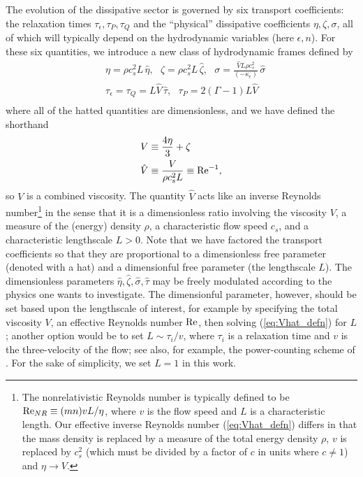 \documentclass[%
notitlepage,
superscriptaddress,
nofootinbib,
amsmath,
amssymb,
aps,
twocolumn
]{revtex4-1}
\newcommand{\Ren}{\textnormal{Re}}
\begin{document}
The evolution of the dissipative sector is governed by six transport
coefficients: the
relaxation times $\tau_{\epsilon}, \tau_{P}, \tau_{Q}$ and the ``physical''
dissipative coefficients $\eta, \zeta, \sigma$,
all of which will typically depend on the hydrodynamic variables
(here $\epsilon, n$).
For these six quantities,
we introduce a new class of hydrodynamic frames defined by
\begin{equation} \label{eq:hydro_frame}
\begin{aligned}
&\eta = \rho c_s^2 L \, \hat{\eta}, ~~~ \zeta = \rho c_s^2 L \, \hat{\zeta}, ~~~ \sigma = \frac{\hat{V} L \rho c_s^2}{(-\kappa_{\epsilon})} \, \hat{\sigma} \\
&\tau_{\epsilon} = \tau_{Q} = L \hat{V} \, \hat{\tau} , ~~~ \tau_{P} = 2 (\Gamma - 1) L \hat{V} \\
\end{aligned}
\end{equation}
where all of the hatted quantities are dimensionless, and we have defined
the shorthand
\begin{align}
V &\equiv \frac{4 \eta}{3} + \zeta \label{eq:V} \\
\hat{V} &\equiv \frac{V}{\rho c_s^2 L} \equiv \Ren^{-1}, \label{eq:Vhat_defn}
\end{align}
so $V$ is a combined viscosity.  The quantity $\hat{V}$ acts like an
inverse Reynolds number\footnote{The nonrelativistic Reynolds number is
  typically defined to be $\Ren_{NR} \equiv (m n) v L/\eta$, where $v$ is
  the flow speed and $L$ is a characteristic length.  Our effective inverse
  Reynolds number (\ref{eq:Vhat_defn}) differs in that the mass density is
replaced by a measure of the total energy density $\rho$, $v$ is replaced
by $c_s^2$ (which must be divided by a factor of $c$ in units where $c \neq
1$) and $\eta \to V$.} in the sense that it is a dimensionless ratio
involving the viscosity $V$, a measure of the (energy) density $\rho$, a
characteristic flow speed $c_s$, and a characteristic lengthscale $L > 0$.
Note that we have factored the transport coefficients so that they are proportional to a dimensionless free parameter (denoted with a hat) and a dimensionful free parameter (the lengthscale $L$).  The dimensionless parameters $\hat{\eta}, \hat{\zeta}, \hat{\sigma}, \hat{\tau}$ may be freely modulated according to the physics one wants to investigate.  The dimensionful parameter, however, should be set based upon the lengthscale of interest, for example by specifying the total viscosity $V$, an effective Reynolds number $\Ren$, then solving (\ref{eq:Vhat_defn}) for $L$; another option would be to set $L \sim \tau_{i}/v$, where $\tau_{i}$ is a relaxation time and $v$ is the three-velocity of the flow; see also, for example, the power-counting scheme of \cite{Denicol:2012cn}.
For the sake of simplicity, we set $L = 1$ in this work.
\end{document}
